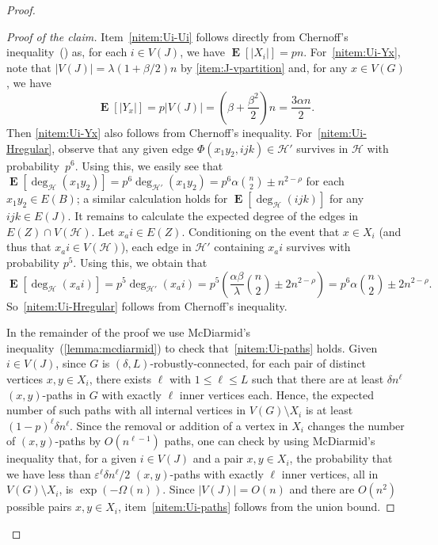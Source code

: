 \documentclass[a4paper, 11pt,reqno]{amsart}
\theoremstyle{plain}
\theoremstyle{definition}
\numberwithin{equation}{section}
\DeclareMathOperator{\expectation}{\mathbf{E}}
\newcommand{\eps}{\varepsilon}
\newenvironment{proofclaim}[1][Proof of the claim]{\begin{proof}[#1]\renewcommand*{\qedsymbol}{\(\square\)}}{\end{proof}}
\renewcommand*{\qedsymbol}{\(\blacksquare\)}
\begin{document}
\begin{proof}
\begin{proofclaim}
	Item~\ref{nitem:Ui-Ui} follows directly from Chernoff's inequality~() as, 
	for each $i \in V(J)$, we have $\expectation[|X_i|] = pn$.  
	For~\ref{nitem:Ui-Yx}, note that $|V(J)| = \lambda (1 + \beta/2)n$ by \ref{item:J-vpartition} and, for any $x\in V(G)$, we have
	\[
	\expectation[|Y_x|] = p|V(J)| = \left(\beta + \frac{\beta^2}{2} \right)n =
	\frac{3\alpha n}{2}.
	\]
	Then \ref{nitem:Ui-Yx} also follows from Chernoff's inequality.
	For~\ref{nitem:Ui-Hregular}, observe that any given edge 
	$\Phi(x_1 y_2, ijk) \in \mathcal{H}'$ survives in $\mathcal{H}$ with probability~$p^6$.  
	Using this, we easily see that $\expectation[\deg_{\mathcal{H}}(x_1 y_2)] 
	= p^6 \deg_{\mathcal{H'}}(x_1 y_2) = p^6 \alpha \binom{n}{2} \pm n^{2 - \rho}$ 
	for each $x_1 y_2 \in E(B)$; a similar calculation holds for
	$\expectation[\deg_{\mathcal{H}}(ijk)]$ for any $ijk \in E(J)$.
	It remains to calculate the expected degree of the edges in $E(Z) \cap V(\mathcal{H})$.  
	Let $x_a i \in E(Z)$.  Conditioning on the event that $x \in X_i$
	(and thus that $x_a i \in V(\mathcal{H})$), each edge in $\mathcal{H}'$ 
	containing $x_a i$ survives with probability $p^5$.  Using this, we obtain that
	\[
	\expectation[\deg_{\mathcal{H}}(x_a i)] 
	= p^5 \deg_{\mathcal{H'}}(x_a i) 
	= p^5 \left( \frac{\alpha \beta}{\lambda} \binom{n}{2} \pm 2n^{2 - \rho} \right) 
	= p^6\alpha \binom{n}{2} \pm 2 n^{2 - \rho}.
	\]
	So~\ref{nitem:Ui-Hregular} follows from Chernoff's inequality.
	
	In the remainder of the proof we use McDiarmid's
        inequality~(\cref{lemma:mcdiarmid}) to check
        that~\ref{nitem:Ui-paths} holds.  Given $i \in V(J)$, since
        $G$ is $(\delta,L)$-robustly-connected, for each pair of
        distinct vertices $x, y \in X_i$, there exists $\ell$ with $1
        \leq \ell \leq L$ such that there are at least $\delta n^\ell$
        $(x,y)$-paths in $G$ with exactly $\ell$ inner vertices each.  Hence,
        the expected number of such paths with all internal vertices
        in $V(G)\setminus X_i$ is at least $(1-p)^{\ell}\delta
        n^{\ell}$. Since the removal or addition of a vertex in $X_i$
        changes the number of $(x,y)$-paths by $O(n^{\ell-1})$
        paths, one can check by using McDiarmid's inequality that, for
        a given $i\in V(J)$ and a pair $x, y \in X_i$, the probability
        that we have less than $\eps^\ell\delta n^\ell/2$
        $(x,y)$-paths with exactly $\ell$ inner vertices, all in $V(G)
        \setminus X_i$, is $\exp(-\Omega(n))$. Since
        $|V(J)|=O(n)$ and there are $O(n^2)$ possible pairs $x,y\in
        X_i$, item~\ref{nitem:Ui-paths} follows from the union bound.
\end{proofclaim}


\end{proof}
\end{document}
